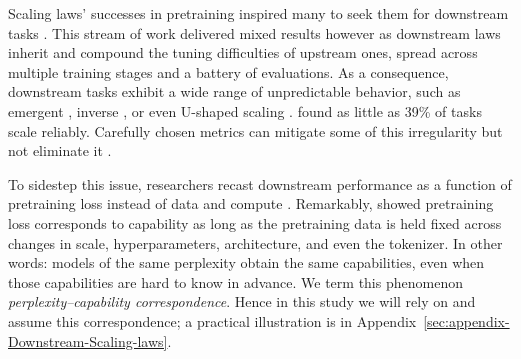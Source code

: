 Scaling laws' successes in pretraining inspired many to seek them for downstream tasks \citep{ivgi-etal-2022-scaling, gadre2025language, chen2025scaling,Mahmood_2022_CVPR, openai2023gpt4}. This stream of work delivered mixed results however as downstream laws inherit and compound the tuning difficulties of upstream ones, spread across multiple training stages and a battery of evaluations. As a consequence, downstream tasks exhibit a wide range of unpredictable behavior, such as emergent \citep{wei2022emergent,srivastava2023beyond}, inverse \citep{mckenzie2023inverse, wilcox2024bigger}, or even U-shaped scaling \citep{wei2023inversescalingushaped}. \citet{lourie-etal-2025-scaling} found as little as 39\% of tasks scale reliably. Carefully chosen metrics can mitigate some of this irregularity \citep{schaeffer2023mirage, schaeffer2025why} but not eliminate it \citep{du-etal-2024-understanding, zhao2026randomscalingemergentcapabilities}. 

To sidestep this issue, researchers recast downstream performance as a function of pretraining loss instead of data and compute \citep{xia-etal-2023-training, snell2024predicting, huang2024compression, du-etal-2024-understanding, gadre2025language, chen2025scaling}. Remarkably, \citet{mayilvahanan25a} showed pretraining loss corresponds to capability as long as the pretraining data is held fixed across changes in scale, hyperparameters, architecture, and even the tokenizer. In other words: models of the same perplexity obtain the same capabilities, even when those capabilities are hard to know in advance. We term this phenomenon \emph{perplexity--capability correspondence}. Hence in this study we will rely on and assume this correspondence; a practical illustration is in Appendix~\ref{sec:appendix-Downstream-Scaling-laws}.

